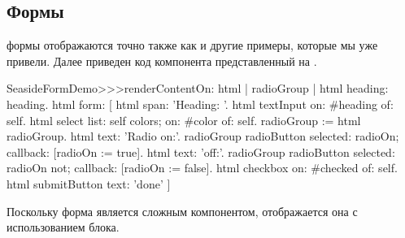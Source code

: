 \documentclass[a4paper,10pt,twoside]{book}
\begin{document}


\subsection{Формы}


формы отображаются точно также как и другие примеры,
которые мы уже привели.
Далее приведен код компонента  представленный на
.

\begin{code}{}
SeasideFormDemo>>>renderContentOn: html
	| radioGroup |
	html heading: heading.
	html form: [
		html span: 'Heading: '.
		html textInput on: #heading of: self.
		html select
			list: self colors;
			on: #color of: self.
		radioGroup := html radioGroup.
		html text: 'Radio on:'.
		radioGroup radioButton
			selected: radioOn;
			callback: [radioOn := true].
		html text: 'off:'.
		radioGroup radioButton
			selected: radioOn not;
			callback: [radioOn := false].
		html checkbox on: #checked of: self.
		html submitButton
			text: 'done' ]
\end{code}{}


Поскольку форма является сложным компонентом, отображается она с использованием блока.
\end{document}
